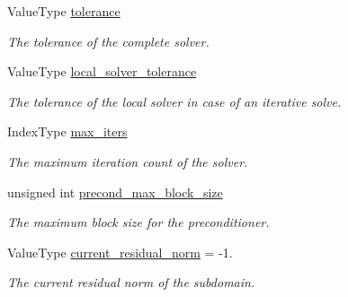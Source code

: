 \begin{DoxyCompactItemize}
Value\+Type \hyperlink{structSchwarzWrappers_1_1Metadata_aed5beadd821e0ccb6cea69770e1371f7}{tolerance}
\begin{DoxyCompactList}\small\item\em The tolerance of the complete solver. \end{DoxyCompactList}\item 
Value\+Type \hyperlink{structSchwarzWrappers_1_1Metadata_aeb4194b56ae389b3b836222b42798e7b}{local\+\_\+solver\+\_\+tolerance}
\begin{DoxyCompactList}\small\item\em The tolerance of the local solver in case of an iterative solve. \end{DoxyCompactList}\item 
\mbox{\label{structSchwarzWrappers_1_1Metadata_a78f04f4b7c58c9260d7e79aac6f10cda}} 
Index\+Type \hyperlink{structSchwarzWrappers_1_1Metadata_a78f04f4b7c58c9260d7e79aac6f10cda}{max\+\_\+iters}
\begin{DoxyCompactList}\small\item\em The maximum iteration count of the solver. \end{DoxyCompactList}\item 
\mbox{\label{structSchwarzWrappers_1_1Metadata_abc1ca0d9049b43dcad781e1f493574bc}} 
unsigned int \hyperlink{structSchwarzWrappers_1_1Metadata_abc1ca0d9049b43dcad781e1f493574bc}{precond\+\_\+max\+\_\+block\+\_\+size}
\begin{DoxyCompactList}\small\item\em The maximum block size for the preconditioner. \end{DoxyCompactList}\item 
\mbox{\label{structSchwarzWrappers_1_1Metadata_a6198abaf20779ebdca20c5bc2537de58}} 
Value\+Type \hyperlink{structSchwarzWrappers_1_1Metadata_a6198abaf20779ebdca20c5bc2537de58}{current\+\_\+residual\+\_\+norm} = -\/1.
\begin{DoxyCompactList}\small\item\em The current residual norm of the subdomain. \end{DoxyCompactList}\item 
\mbox{\label{structSchwarzWrappers_1_1Metadata_a536b647d0c8ec4328e46583a53fa19b3}} 

\end{DoxyCompactItemize}
